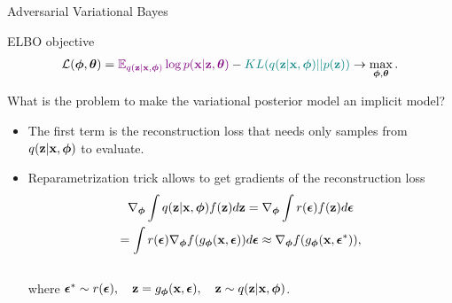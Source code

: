 \begin{frame}{Adversarial Variational Bayes}
	\begin{block}{ELBO objective}
		\vspace{-0.6cm}
		\[
			 \mathcal{L} (\boldsymbol{\phi}, \boldsymbol{\theta})  = {\color{violet}\mathbb{E}_{q(\mathbf{z} | \mathbf{x}, \boldsymbol{\phi})} \log p(\mathbf{x} | \mathbf{z}, \boldsymbol{\theta})} - {\color{teal}KL(q(\mathbf{z}| \mathbf{x}, \boldsymbol{\phi}) || p(\mathbf{z}))} \rightarrow \max_{\boldsymbol{\phi}, \boldsymbol{\theta}}.
		\]	
		\vspace{-0.6cm}
	\end{block}
	What is the problem to make the variational posterior model an implicit model?
	\begin{itemize}
	\item {\color{violet}The first term} is the reconstruction loss that needs only samples from $q(\mathbf{z} | \mathbf{x}, \boldsymbol{\phi})$ to evaluate.
	\item Reparametrization trick allows to get gradients of the reconstruction loss
		\vspace{-0.4cm}
		\begin{multline*}
			\nabla_{\boldsymbol{\phi}}\int q(\mathbf{z}|\mathbf{x}, \boldsymbol{\phi}) f(\mathbf{z}) d\mathbf{z} = \nabla_{\boldsymbol{\phi}}\int r(\boldsymbol{\epsilon})  f(\mathbf{z}) d\boldsymbol{\epsilon} \\ = \int r(\boldsymbol{\epsilon}) \nabla_{\boldsymbol{\phi}} f(g_{\boldsymbol{\phi}}(\mathbf{x}, \boldsymbol{\epsilon})) d\boldsymbol{\epsilon} \approx \nabla_{\boldsymbol{\phi}} f(g_{\boldsymbol{\phi}}(\mathbf{x}, \boldsymbol{\epsilon}^*)),
		\end{multline*}
		\vspace{-0.6cm} \\
		where $\boldsymbol{\epsilon}^* \sim r(\boldsymbol{\epsilon}), \quad \mathbf{z} = g_{\boldsymbol{\phi}}(\mathbf{x}, \boldsymbol{\epsilon}), \quad \mathbf{z} \sim q(\mathbf{z} | \mathbf{x}, \boldsymbol{\phi})$.
	\end{itemize}
\end{frame}

